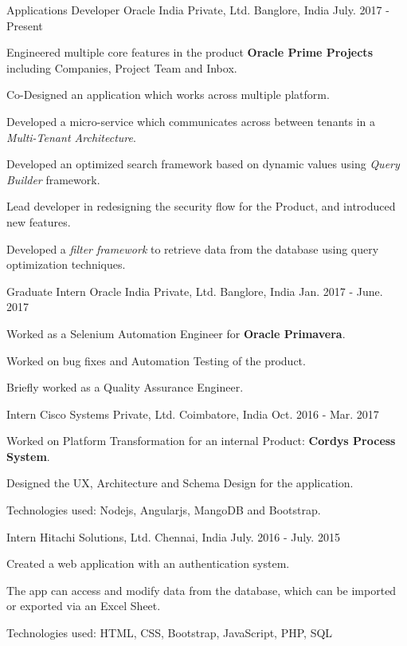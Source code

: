 \begin{cventries}
  \cventry
    {Applications Developer}
    {Oracle India Private, Ltd.}
    {Banglore, India}
    {July. 2017 - Present}
    {
      \begin{cvitems}
        \item {Engineered multiple core features in the product \textbf{Oracle Prime Projects} including Companies, Project Team and Inbox.}
        \item {Co-Designed an application which works across multiple platform.}
        \item {Developed a micro-service which communicates across between tenants in a \textit{Multi-Tenant Architecture}.}
        \item {Developed an optimized search framework based on dynamic values using \textit{Query Builder} framework.}
        \item {Lead developer in redesigning the security flow for the Product, and introduced new features.}
        \item {Developed a \textit{filter framework} to retrieve data from the database using query optimization techniques.}
      \end{cvitems}
    }
  \cventry
    {Graduate Intern}
    {Oracle India Private, Ltd.}
    {Banglore, India}
    {Jan. 2017 - June. 2017}
    {
      \begin{cvitems}
        \item {Worked as a Selenium Automation Engineer for \textbf{Oracle Primavera}.}
        \item {Worked on bug fixes and Automation Testing of the product.}
        \item {Briefly worked as a Quality Assurance Engineer.}
      \end{cvitems}
    }
  \cventry
    {Intern}
    {Cisco Systems Private, Ltd.}
    {Coimbatore, India}
    {Oct. 2016 - Mar. 2017}
    {
      \begin{cvitems}
        \item {Worked on Platform Transformation for an internal Product: \textbf{Cordys Process System}.}
        \item {Designed the UX, Architecture and Schema Design for the application.}
        \item {Technologies used: Nodejs, Angularjs, MangoDB and Bootstrap.}
      \end{cvitems} 
    }
  \cventry
    {Intern}
    {Hitachi Solutions, Ltd.}
    {Chennai, India}
    {July. 2016 - July. 2015}
    {
      \begin{cvitems}
        \item {Created a web application with an authentication system.}
        \item {The app can access and modify data from the database, which can be imported or exported via an Excel Sheet.}
        \item {Technologies used: HTML, CSS, Bootstrap, JavaScript, PHP, SQL }
      \end{cvitems}
    }
\end{cventries}